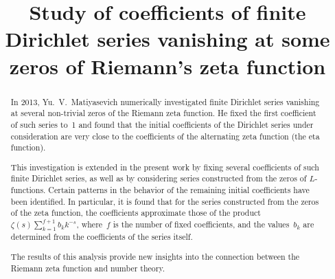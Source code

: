 \documentclass[intlimits,twoside,a4paper,11pt]{article}
\begin{document}
    \begin{translatedpart}
        \title{Study of coefficients of finite Dirichlet series vanishing at some zeros of Riemann's zeta function}





        \maketranslatedtitle

        \begin{abstract}
            In 2013, Yu.~V.~Matiyasevich numerically investigated finite Dirichlet series vanishing at 
            several non-trivial zeros of the Riemann zeta function. 
            He fixed the first coefficient of such series to~1 and found 
            that the initial coefficients of the Dirichlet series under 
            consideration are very close to the coefficients of the 
            alternating zeta function (the eta function).


            This investigation is extended in the present work by fixing several coefficients 
            of such finite Dirichlet series, as well as by considering 
            series constructed from the zeros of $L$-functions. 
            Certain patterns in the behavior of the remaining initial coefficients 
            have been identified. In particular, it is found that for the 
            series constructed from the zeros of the zeta function, the 
            coefficients approximate those of the product 
            $\zeta(s)\sum_{k=1}^{f+1}{b_k k^{-s}}$, where~$f$ is the number of 
            fixed coefficients, and the values~$b_k$ are determined from the coefficients of the series itself.


            The results of this analysis provide new insights into the connection between the Riemann zeta function and number theory.


\end{abstract}
\end{translatedpart}
\end{document}
